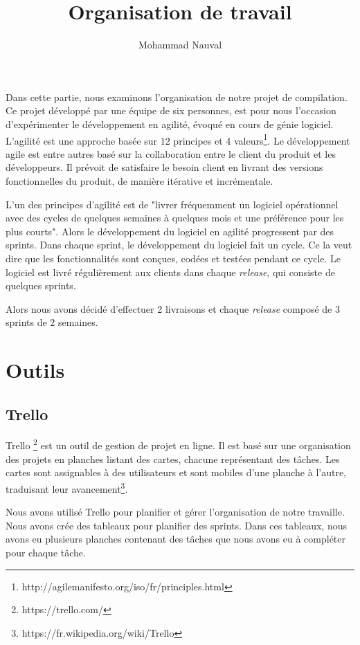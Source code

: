 \documentclass[a4paper,12pt]{article}
\title{Organisation de travail}
\author{Mohammad Nauval}
\begin{document}
\maketitle

Dans cette partie, nous examinons l'organisation de notre projet de compilation. Ce projet développé par une équipe de six personnes, est pour nous l'occasion d'expérimenter le développement en agilité, évoqué en cours de génie logiciel. L'agilité est une approche basée sur 12 principes et 4 valeurs\footnote{http://agilemanifesto.org/iso/fr/principles.html}. Le développement agile est entre autres basé sur la collaboration entre le client du produit et les développeurs. Il prévoit de satisfaire le besoin client en livrant des versions fonctionnelles du produit, de manière itérative et incrémentale. 

L'un des principes d'agilité est de "livrer fréquemment un logiciel opérationnel avec des
cycles de quelques semaines à quelques mois et une préférence pour les plus courts". Alors le développement du logiciel en agilité progressent par des sprints. Dans chaque sprint, le développement du logiciel fait un cycle. Ce la veut dire que les fonctionnalités sont conçues, codées et testées pendant ce cycle. Le logiciel est livré régulièrement aux clients dans chaque \textit{release}, qui consiste de quelques sprints. 

Alors nous avons décidé d'effectuer 2 livraisons et chaque \textit{release} composé de 3 sprints de 2 semaines.   


\section{Outils}
\subsection{Trello}
Trello \footnote{https://trello.com/} est un outil de gestion de projet en ligne. Il est basé sur une organisation des projets en planches listant des cartes, chacune représentant des tâches. Les cartes sont assignables à des utilisateurs et sont mobiles d'une planche à l'autre, traduisant leur avancement\footnote{https://fr.wikipedia.org/wiki/Trello}. 

Nous avons utilisé Trello pour planifier et gérer l'organisation de notre travaille. Nous avons crée des tableaux pour planifier des sprints. Dans ces tableaux, nous avons eu plusieurs planches contenant des tâches que nous avons eu à compléter pour chaque tâche.
\end{document}
